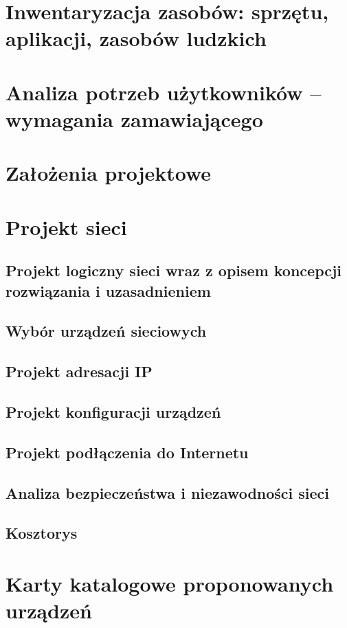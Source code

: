 \documentclass[12pt,a4paper]{article}
\begin{document}
\section{Inwentaryzacja zasobów: sprzętu, aplikacji, zasobów ludzkich}

\section{Analiza potrzeb użytkowników -- wymagania zamawiającego}

\section{Założenia projektowe}

\section{Projekt sieci}

\subsection{Projekt logiczny sieci wraz z opisem koncepcji rozwiązania i uzasadnieniem}

\subsection{Wybór urządzeń sieciowych}

\subsection{Projekt adresacji IP}

\subsection{Projekt konfiguracji urządzeń}

\subsection{Projekt podłączenia do Internetu}

\subsection{Analiza bezpieczeństwa i niezawodności sieci}

\subsection{Kosztorys}

\section{Karty katalogowe proponowanych urządzeń}
\end{document}
